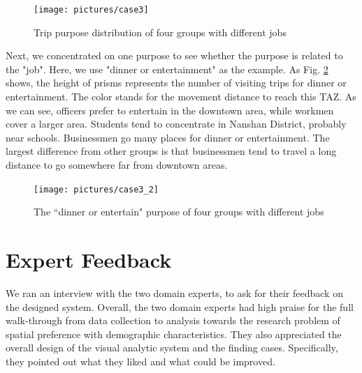 \documentclass{ieeeaccess}
\begin{document}
\begin{figure}[htb!]
 \centering %
 \texttt{[image: pictures/case3]}
 \caption{Trip purpose distribution of four groups with different jobs}
 \label{case3}
\end{figure}

Next, we concentrated on one purpose to see whether the purpose is related to the "job". Here, we use "dinner or entertainment" as the example. As Fig. \ref{case32} shows, the height of prisms represents the number of visiting trips for dinner or entertainment. The color stands for the movement distance to reach this TAZ. As we can see, officers prefer to entertain in the downtown area, while workmen cover a larger area. Students tend to concentrate in Nanshan District, probably near schools. Businessmen go many places for dinner or entertainment. The largest difference from other groups is that businessmen tend to travel a long distance to go somewhere far from downtown areas.

\begin{figure}[htb!]
 \centering %
 \texttt{[image: pictures/case3\_2]}
 \caption{The ``dinner or entertain" purpose of four groups with different jobs}
 \label{case32}
\end{figure}




\section{Expert Feedback}

We ran an interview with the two domain experts, to ask for their feedback on the designed system. Overall, the two domain experts had high praise for the full walk-through from data collection to analysis towards the research problem of spatial preference with demographic characteristics. They also appreciated the overall design of the visual analytic system and the finding cases. Specifically, they pointed out what they liked and what could be improved.
\end{document}
